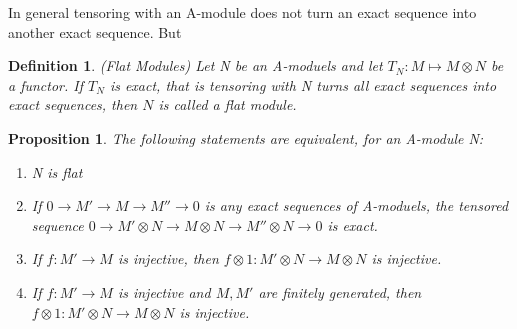 \documentclass[]{report}
\newtheorem{prop}[theorem]{Proposition}
\newtheorem{defn}[theorem]{Definition}
\begin{document}
In general tensoring with an A-module does not turn an exact sequence into another exact sequence. But

\begin{defn} 
    (Flat Modules) Let N be an A-moduels and let $T_N: M\mapsto M\otimes N$ be a functor. If $T_N$ is exact, that is tensoring with N turns all exact sequences into exact sequences, then $N$ is called a flat module. 
\end{defn}

\begin{prop}
    The following statements are equivalent, for an A-module N:
    \begin{enumerate}
        \item N is flat
        \item If $0\rightarrow M' \rightarrow M\rightarrow M'' \rightarrow 0$ is any exact sequences of A-moduels, the tensored sequence $0\rightarrow M'\otimes N\rightarrow M\otimes N\rightarrow M''\otimes N \rightarrow 0$ is exact.
        \item If $f: M' \rightarrow M$ is injective, then $f\otimes 1: M'\otimes N \rightarrow M\otimes N$ is injective.
        \item If $f:M'\rightarrow M$ is injective and $M,M'$ are finitely generated, then $f\otimes 1: M'\otimes N \rightarrow M\otimes N$ is injective. 
    \end{enumerate}
\end{prop}
\end{document}
